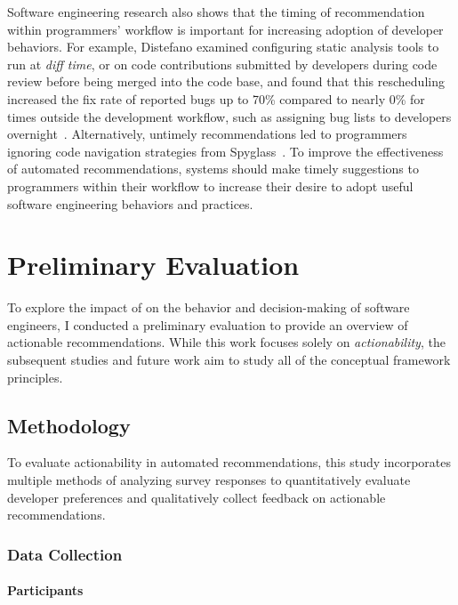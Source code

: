 Software engineering research also shows that the timing of recommendation within programmers' workflow is important for increasing adoption of developer behaviors. For example, Distefano examined configuring static analysis tools to run at \textit{diff time}, or on code contributions submitted by developers during code review before being merged into the code base, and found that this rescheduling increased the fix rate of reported bugs up to 70\% compared to nearly 0\% for times outside the development workflow, such as assigning bug lists to developers overnight~\cite{Distefano2019Facebook}. Alternatively, untimely recommendations led to programmers ignoring code navigation strategies from Spyglass~\cite{viriyakattiyaporn2009challenges}. To improve the effectiveness of automated recommendations, systems should make timely suggestions to programmers within their workflow to increase their desire to adopt useful software engineering behaviors and practices.



\section{Preliminary Evaluation}

To explore the impact of \framework on the behavior and decision-making of software engineers, I conducted a preliminary evaluation to provide an overview of actionable recommendations. While this work focuses solely on \textit{actionability}, the subsequent studies and future work aim to study all of the conceptual framework principles.

\subsection{Methodology}

To evaluate actionability in automated recommendations, this study incorporates multiple methods of analyzing survey responses to quantitatively evaluate developer preferences and qualitatively collect feedback on actionable recommendations.

\subsubsection{Data Collection}

\paragraph*{Participants}

